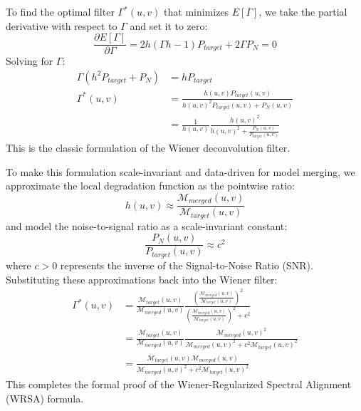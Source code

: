 \documentclass{article}
\theoremstyle{plain}
\theoremstyle{definition}
\theoremstyle{remark}
\begin{document}
To find the optimal filter $\Gamma^*(u, v)$ that minimizes $E[\Gamma]$, we take the partial derivative with respect to $\Gamma$ and set it to zero:
\begin{equation}
  \frac{\partial E[\Gamma]}{\partial \Gamma} = 2 h (\Gamma h - 1) P_{target} + 2 \Gamma P_N = 0
\end{equation}
Solving for $\Gamma$:
\begin{align*}
  \Gamma (h^2 P_{target} + P_N) &= h P_{target} \\
  \Gamma^*(u, v) &= \frac{h(u, v) P_{target}(u, v)}{h(u, v)^2 P_{target}(u, v) + P_N(u, v)} \\
  &= \frac{1}{h(u, v)} \frac{h(u, v)^2}{h(u, v)^2 + \frac{P_N(u, v)}{P_{target}(u, v)}}
\end{align*}
This is the classic formulation of the Wiener deconvolution filter. 

To make this formulation scale-invariant and data-driven for model merging, we approximate the local degradation function as the pointwise ratio:
\begin{equation}
  h(u, v) \approx \frac{\mathcal{M}_{merged}(u, v)}{\mathcal{M}_{target}(u, v)}
\end{equation}
and model the noise-to-signal ratio as a scale-invariant constant:
\begin{equation}
  \frac{P_N(u, v)}{P_{target}(u, v)} \approx c^2
\end{equation}
where $c > 0$ represents the inverse of the Signal-to-Noise Ratio (SNR). Substituting these approximations back into the Wiener filter:
\begin{align*}
  \Gamma^*(u, v) &= \frac{\mathcal{M}_{target}(u, v)}{\mathcal{M}_{merged}(u, v)} \frac{\left( \frac{\mathcal{M}_{merged}(u, v)}{\mathcal{M}_{target}(u, v)} \right)^2}{\left( \frac{\mathcal{M}_{merged}(u, v)}{\mathcal{M}_{target}(u, v)} \right)^2 + c^2} \\
  &= \frac{\mathcal{M}_{target}(u, v)}{\mathcal{M}_{merged}(u, v)} \frac{\mathcal{M}_{merged}(u, v)^2}{\mathcal{M}_{merged}(u, v)^2 + c^2 \mathcal{M}_{target}(u, v)^2} \\
  &= \frac{\mathcal{M}_{target}(u, v) \mathcal{M}_{merged}(u, v)}{\mathcal{M}_{merged}(u, v)^2 + c^2 \mathcal{M}_{target}(u, v)^2}
\end{align*}
This completes the formal proof of the Wiener-Regularized Spectral Alignment (WRSA) formula.
\end{document}
